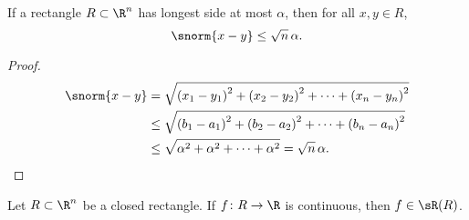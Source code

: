 \begin{prop} \label{prop:diameterrectangle}
If a rectangle $R \subset \R^n$ has longest side at most $\alpha$, then
for all $x,y \in R$,
\begin{equation*}
\snorm{x-y} \leq \sqrt{n} \, \alpha .
\end{equation*}
\end{prop}

\begin{proof}
\begin{equation*}
\begin{split}
\snorm{x-y} 
& =
\sqrt{
{(x_1-y_1)}^2
+
{(x_2-y_2)}^2
+ \cdots +
{(x_n-y_n)}^2
}
\\
& \leq
\sqrt{
{(b_1-a_1)}^2
+
{(b_2-a_2)}^2
+ \cdots +
{(b_n-a_n)}^2
}
\\
& \leq
\sqrt{
{\alpha}^2
+
{\alpha}^2
+ \cdots +
{\alpha}^2
}
=
\sqrt{n} \, \alpha .  \qedhere
\end{split}
\end{equation*}
\end{proof}


\begin{thm} \label{mv:thm:contintrect}
Let $R \subset \R^n$ be a closed rectangle.
If $f \colon R \to \R$ is continuous, then $f \in \sR(R)$.
\end{thm}

